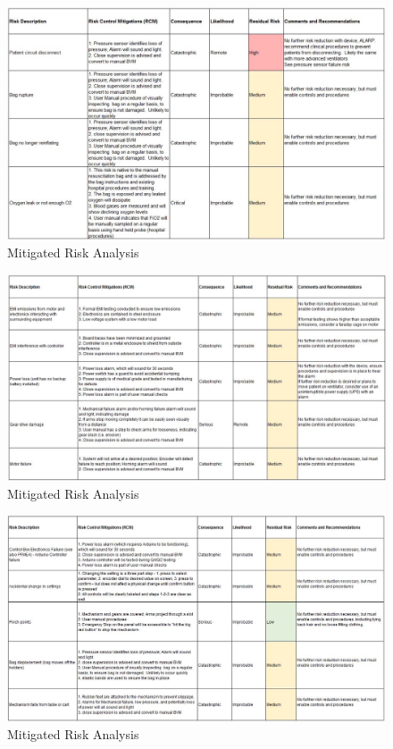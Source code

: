 \documentclass[]{article}
\begin{document}
\begin{appendices}
\begin{figure}
	\includegraphics[scale= 0.66]{figures/mit1.jpg}
	\caption{Mitigated Risk Analysis}
	\label{fig:mit1}
\end{figure}

\begin{figure}
	\includegraphics[scale= 0.7]{figures/mit2.jpg}
	\caption{Mitigated Risk Analysis}
	\label{fig:mit2}
\end{figure}

\begin{figure}
	\includegraphics[scale= 0.7]{figures/mit3.jpg}
	\caption{Mitigated Risk Analysis}
	\label{fig:mit3}
\end{figure}


\end{appendices}
\end{document}
